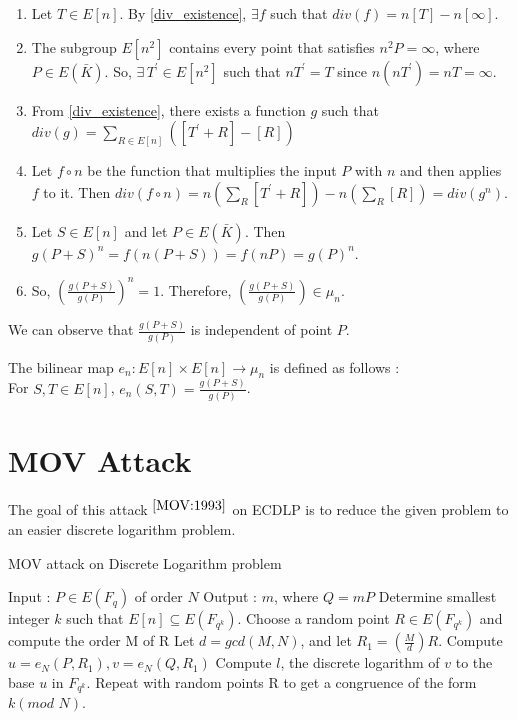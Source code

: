 \begin{enumerate} 
\item Let $T \in E[n]$. By \ref{div_existence}, $\exists f$ such that $div(f) = n[T] - n[\infty]$. 
\item The subgroup $E[n^2]$ contains every point that satisfies $n^2 P = \infty$, where $P \in E(\bar{K})$. So, $\exists \, T^{'} \in E[n^2]$ such that $nT^{'} = T$  since $n(nT^{'}) = nT = \infty$.
\item From \ref{div_existence}, there exists a function $g$ such that $div(g) = \sum\limits_{R \in E[n]} \left( [T^{'} + R] - [R] \right)$
\item Let $f \circ n$  be the function that multiplies the input $P$ with $n$ and then applies $f$ to it. Then $div(f \circ n) = n \left( \sum\limits_R [T^{'} + R] \right) - n \left( \sum\limits_R [R] \right) = div(g^n)$.
\item Let $S \in E[n]$ and let $P \in E(\bar{K})$. Then \\
$g(P+S)^n = f(n(P+S)) = f(nP) = g(P)^n$.
\item So, $\left(\frac{g(P+S)}{g(P)}\right)^n = 1$. Therefore,  $\left(\frac{g(P+S)}{g(P)}\right) \in \mu_n$.
\end{enumerate}

We can observe that $\frac{g(P+S)}{g(P)}$ is independent of point $P$. 
\begin{definition}
\label{weil_pairing}
The bilinear map $e_n : E[n] \times E[n] \rightarrow \mu_n$ is defined as follows : \\ For $S, T \in E[n]$, $e_n(S, T) = \frac{g(P+S)}{g(P)}$. 
\end{definition}

\newpage 
\section{MOV Attack}
The goal of this attack $^{\cite{MOV:1993}}$ on ECDLP is to reduce the given problem to an easier discrete logarithm problem. 
\begin{algorithm}
\caption{MOV attack on Discrete Logarithm problem}
\begin{algorithmic}[1]
\State Input : $P \in E(F_q)$ of order $N$
\State Output : $m$, where $Q = mP$ 
\State Determine smallest integer $k$ such that $E[n] \subseteq E(F_{q^k})$. 
\State Choose a random point $R \in E(F_{q^k})$ and compute the order M of R
\State Let $d = gcd(M, N)$, and let $R_1 = (\frac{M}{d}) R$.
\State Compute $u = e_N(P, R_1), v = e_N(Q, R_1)$
\State Compute $l$, the discrete logarithm of $v$ to the base $u$ in $F_{q^k}$. 
\State Repeat with random points R to get a congruence of the form $k (mod \,\, N)$. 
\EndProcedure 
\end{algorithmic}
\end{algorithm}

